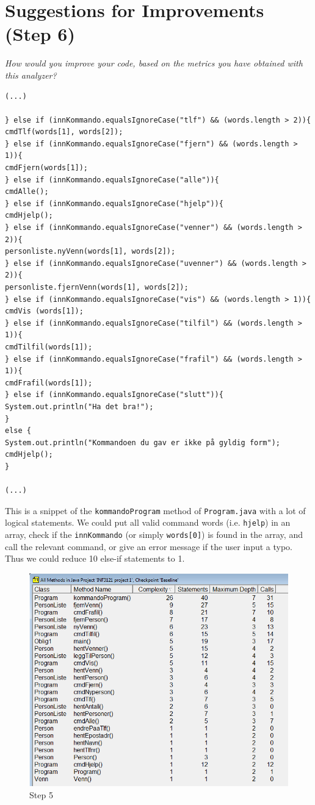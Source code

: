 \documentclass{article}
\begin{document}
\section{Suggestions for Improvements (Step 6)}
\textit{How would you improve your code, based on the metrics you have obtained with this analyzer?}

\begin{verbatim}
(...)

} else if (innKommando.equalsIgnoreCase("tlf") && (words.length > 2)){
cmdTlf(words[1], words[2]);
} else if (innKommando.equalsIgnoreCase("fjern") && (words.length > 1)){
cmdFjern(words[1]);
} else if (innKommando.equalsIgnoreCase("alle")){
cmdAlle();
} else if (innKommando.equalsIgnoreCase("hjelp")){
cmdHjelp();
} else if (innKommando.equalsIgnoreCase("venner") && (words.length > 2)){
personliste.nyVenn(words[1], words[2]);
} else if (innKommando.equalsIgnoreCase("uvenner") && (words.length > 2)){
personliste.fjernVenn(words[1], words[2]);
} else if (innKommando.equalsIgnoreCase("vis") && (words.length > 1)){
cmdVis (words[1]);
} else if (innKommando.equalsIgnoreCase("tilfil") && (words.length > 1)){
cmdTilfil(words[1]);
} else if (innKommando.equalsIgnoreCase("frafil") && (words.length > 1)){
cmdFrafil(words[1]);
} else if (innKommando.equalsIgnoreCase("slutt")){
System.out.println("Ha det bra!");
}
else {
System.out.println("Kommandoen du gav er ikke på gyldig form");
cmdHjelp();
} 

(...)
\end{verbatim}

This is a snippet of the \texttt{kommandoProgram} method of \texttt{Program.java} with a lot of logical statements. 
We could put all valid command words (i.e. \texttt{hjelp}) in an array, check if the \texttt{innKommando} (or simply 
\texttt{words[0]}) is found in the array, and call the relevant command, or give an error message if the user input a 
typo. Thus we could reduce 10 else-if statements to 1.

\begin{figure}
\centerline{ 
 \includegraphics[scale=0.5]{step5_method-metrics}
}
\caption{Step 5}
\end{figure}
\end{document}
